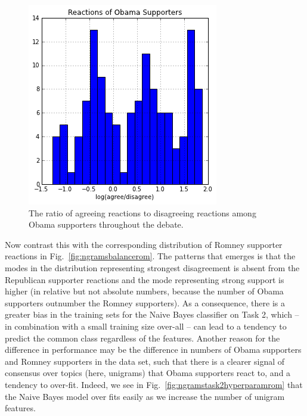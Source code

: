 \begin{figure}[]
	\centering
	\includegraphics[scale=0.60]{Figures/ngrams_balance_oba.png}
	\caption{The ratio of agreeing reactions to disagreeing reactions among Obama supporters throughout the debate.}
	\label{fig:ngramsbalanceoba}
\end{figure}

Now contrast this with the corresponding distribution of Romney supporter reactions in Fig.~\ref{fig:ngramsbalancerom}.  The patterns that emerges is that the modes in the distribution representing strongest disagreement is absent from the Republican supporter reactions and the mode representing strong support is higher (in relative but not absolute numbers, because the number of Obama supporters outnumber the Romney supporters).  As a consequence, there is a greater bias in the training sets for the Naive Bayes classifier on Task 2, which -- in combination with a small training size over-all -- can lead to a tendency to predict the common class regardless of the features.  Another reason for the difference in performance may be the difference in numbers of Obama supporters and Romney supporters in the data set, such that there is a clearer signal of consensus over topics (here, unigrams) that Obama supporters react to, and a tendency to over-fit.  Indeed, we see in Fig.~\ref{fig:ngramstask2hyperparamrom} that the Naive Bayes model over fits easily as we increase the number of unigram features.


